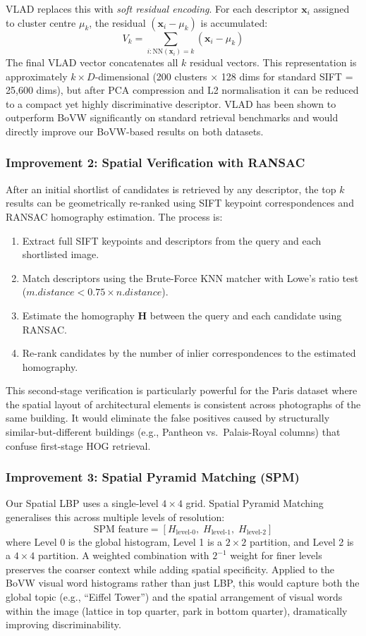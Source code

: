 \documentclass[11pt, a4paper]{article}
\begin{document}
VLAD replaces this with \textit{soft residual encoding}. For each descriptor $\mathbf{x}_i$ assigned to cluster centre $\mu_k$, the residual $(\mathbf{x}_i - \mu_k)$ is accumulated:
\[
  V_k = \sum_{i : \text{NN}(\mathbf{x}_i)=k} (\mathbf{x}_i - \mu_k)
\]
The final VLAD vector concatenates all $k$ residual vectors. This representation is approximately $k\times D$-dimensional (200 clusters × 128 dims for standard SIFT = 25,600 dims), but after PCA compression and L2 normalisation it can be reduced to a compact yet highly discriminative descriptor. VLAD has been shown to outperform BoVW significantly on standard retrieval benchmarks and would directly improve our BoVW-based results on both datasets.

\subsubsection{Improvement 2: Spatial Verification with RANSAC}

After an initial shortlist of candidates is retrieved by any descriptor, the top $k$ results can be geometrically re-ranked using SIFT keypoint correspondences and RANSAC homography estimation. The process is:
\begin{enumerate}
  \item Extract full SIFT keypoints and descriptors from the query and each shortlisted image.
  \item Match descriptors using the Brute-Force KNN matcher with Lowe's ratio test ($m.distance < 0.75 \times n.distance$).
  \item Estimate the homography $\mathbf{H}$ between the query and each candidate using RANSAC.
  \item Re-rank candidates by the number of inlier correspondences to the estimated homography.
\end{enumerate}
This second-stage verification is particularly powerful for the Paris dataset where the spatial layout of architectural elements is consistent across photographs of the same building. It would eliminate the false positives caused by structurally similar-but-different buildings (e.g., Pantheon vs.\ Palais-Royal columns) that confuse first-stage HOG retrieval.

\subsubsection{Improvement 3: Spatial Pyramid Matching (SPM)}

Our Spatial LBP uses a single-level $4\times4$ grid. Spatial Pyramid Matching generalises this across multiple levels of resolution:
\[
  \text{SPM feature} = \left[ H_{\text{level-0}}, \; H_{\text{level-1}}, \; H_{\text{level-2}} \right]
\]
where Level 0 is the global histogram, Level 1 is a $2\times2$ partition, and Level 2 is a $4\times4$ partition. A weighted combination with $2^{-1}$ weight for finer levels preserves the coarser context while adding spatial specificity. Applied to the BoVW visual word histograms rather than just LBP, this would capture both the global topic (e.g., ``Eiffel Tower'') and the spatial arrangement of visual words within the image (lattice in top quarter, park in bottom quarter), dramatically improving discriminability.
\end{document}
